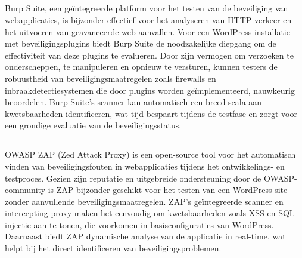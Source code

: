 \subsection{}
Burp Suite, een geïntegreerde platform voor het testen van de beveiliging van webapplicaties, is 
bijzonder effectief voor het analyseren van HTTP-verkeer en het uitvoeren van geavanceerde web 
aanvallen. Voor een WordPress-installatie met beveiligingsplugins biedt Burp Suite de noodzakelijke 
diepgang om de effectiviteit van deze plugins te evalueren. Door zijn vermogen om verzoeken te 
onderscheppen, te manipuleren en opnieuw te versturen, kunnen testers de robuustheid van 
beveiligingsmaatregelen zoals firewalls en inbraakdetectiesystemen die door plugins worden 
geïmplementeerd, nauwkeurig beoordelen. Burp Suite's scanner kan automatisch een breed scala 
aan kwetsbaarheden identificeren, wat tijd bespaart tijdens de testfase en zorgt voor een 
grondige evaluatie van de beveiligingsstatus.

\subsection{}
OWASP ZAP (Zed Attack Proxy) is een open-source tool voor het automatisch vinden van beveiligingsfouten 
in webapplicaties tijdens het ontwikkelings- en testproces. Gezien zijn reputatie en uitgebreide 
ondersteuning door de OWASP-community is ZAP bijzonder geschikt voor het testen van een 
WordPress-site zonder aanvullende beveiligingsmaatregelen. ZAP's geïntegreerde scanner en 
intercepting proxy maken het eenvoudig om kwetsbaarheden zoals XSS en SQL-injectie aan te 
tonen, die voorkomen in basisconfiguraties van WordPress. Daarnaast biedt ZAP dynamische 
analyse van de applicatie in real-time, wat helpt bij het direct identificeren van beveiligingsproblemen.


\section{}


